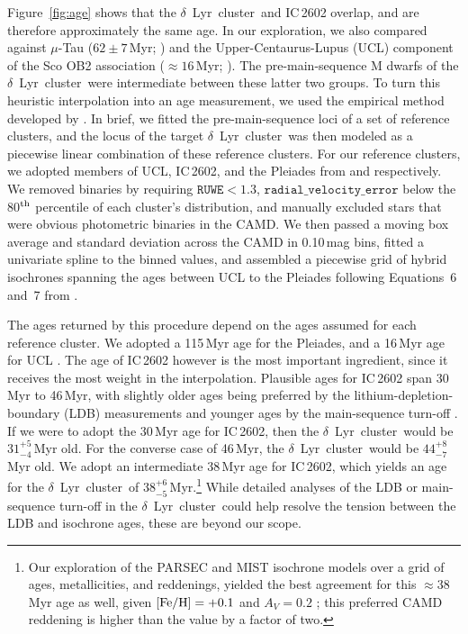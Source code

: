 \documentclass[12pt,modern,twocolumn,tighten]{aastex63}
\newcommand{\cn}{$\delta$\ Lyr\ cluster} %
\newcommand{\clusterage}{$38^{+6}_{-5}$\,Myr} %
\begin{document}
Figure~\ref{fig:age} shows that the \cn\ and IC\,2602 overlap, and are
therefore approximately the same age.  In our exploration, we also
compared against $\mu$-Tau ($62\pm7$\,Myr; \citealt{gagne_mutau_2020})
and the Upper-Centaurus-Lupus (UCL) component of the Sco OB2
association ($\approx$$16$\,Myr; \citealt{pecaut_star_2016}).  The
pre-main-sequence M dwarfs of the \cn\ were intermediate between these
latter two groups.  To turn this heuristic interpolation into an
age measurement, we used the empirical method
developed by \citet{gagne_mutau_2020}.  In brief, we fitted the
pre-main-sequence loci of a set of reference clusters, and the locus
of the target \cn\ was then modeled as a piecewise linear combination
of these reference clusters.  For our reference clusters, we adopted
members of UCL, IC\,2602, and the Pleiades from
\citet{damiani_stellar_2019} and \cite{CantatGaudin2018a}
respectively.  We removed binaries by requiring $\texttt{RUWE}<1.3$,
$\texttt{radial\_velocity\_error}$ below the 80$^{\rm th}$ percentile
of each cluster's distribution, and manually excluded stars that
were obvious photometric binaries in the CAMD.  We then passed a moving
box average and standard deviation across the CAMD in 0.10\,mag bins,
fitted a univariate spline to the binned values, and assembled a
piecewise grid of hybrid isochrones spanning the ages between UCL to
the Pleiades following Equations~6 and~7 from
\citet{gagne_mutau_2020}.  


The ages returned by this procedure depend on the ages assumed for
each reference cluster.  We adopted a 115\,Myr age for the Pleiades,
and a 16\,Myr age for UCL \citep{dahm_2015,pecaut_star_2016}.  The age
of IC\,2602 however is the most important ingredient, since it
receives the most weight in the interpolation.  Plausible ages for
IC\,2602 span 30\,Myr to 46\,Myr, with slightly older ages being
preferred by the lithium-depletion-boundary (LDB) measurements and
younger ages by the main-sequence turn-off
\citep{stauffer_rotational_1997,dobbie_ic_2010,david_ages_2015,randich_gaiaeso_2018,bossini_age_2019,bouma_cluster_2020}.
If we were to adopt the 30\,Myr age for IC\,2602, then the \cn\ would
be $31^{+5}_{-4}$\,Myr old.  For the converse case of 46\,Myr, the
\cn\ would be $44^{+8}_{-7}$\,Myr old.  We adopt an intermediate
38\,Myr age for IC\,2602, which yields an age for the \cn\ of
\clusterage.\footnote{Our exploration of the PARSEC and MIST
isochrone models over a grid of ages, metallicities, and
reddenings, yielded the best agreement for this $\approx 38\,$Myr age
as well, given ${\rm [Fe/H] = +0.1}$ and $A_V=0.2$
\citep{bressan_parsec_2012,choi_mesa_2016};  this preferred CAMD reddening
is higher than the \citet{lallement_threedimensional_2018} value by a factor of two.
} While detailed analyses of the LDB or main-sequence turn-off in the
\cn\ could help resolve the tension between the LDB and isochrone
ages, these are beyond our scope.
\end{document}

